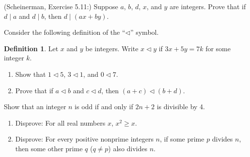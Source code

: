 \documentclass{article}
\theoremstyle{definition}
\newtheorem*{definition}{Definition}
\begin{document}
\begin{question}
    (Scheinerman, Exercise 5.11:)
    Suppose $a$, $b$, $d$, $x$, and $y$ are integers.
    Prove that if $d \mid a$ and $d\mid b$,
    then $d \mid (ax+by)$.
\end{question}
\begin{solution}
\end{solution}



\begin{question}
Consider the following definition of the ``$\triangleleft$'' symbol.
	\begin{definition}
	Let $x$ and $y$ be integers. Write $x\triangleleft y$ if $3x+5y=7k$ for some integer $k$.
	\end{definition}
\begin{enumerate}
\item Show that $1\triangleleft 5$, $3\triangleleft 1$, and $0\triangleleft 7$.
\item Prove that if $a\triangleleft b$ and $c\triangleleft d$, then $(a+c) \triangleleft (b+d)$.
\end{enumerate}
\end{question}
\begin{solution}
\end{solution}

\begin{question}
    Show that an integer $n$ is odd if and only if $2n+2$ is divisible by 4.
\end{question}
\begin{solution}
\end{solution}

\begin{question}
    \begin{enumerate}
        \item Disprove: For all real numbers $x$, $x^2\geq x$.
        \item Disprove: For every positive nonprime integers $n$, if some prime $p$ divides $n$, then some other prime $q$ ($q\neq p$) also divides $n$.
    \end{enumerate}
\end{question}
\begin{solution}
\end{solution}
\end{document}
